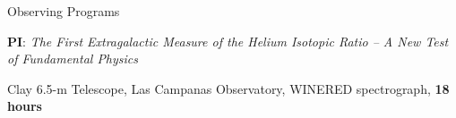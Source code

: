 \documentclass[cv.tex]{subfiles}
\begin{document}
\vspace{4mm}
\noindent
{\color{themecolor} \large Observing Programs}
\par\noindent
\parbox{0.18\textwidth}{%
	 \par
	\null \par
	\null
}
\hspace{1mm}
\parbox{0.8\textwidth}{%
	\textbf{PI}: \textit{The First Extragalactic Measure of the Helium Isotopic
	Ratio -- A New Test \\ of Fundamental Physics} \par
	Clay 6.5-m Telescope, Las Campanas Observatory, WINERED spectrograph,
	\textbf{18 hours}
}
\end{document}
